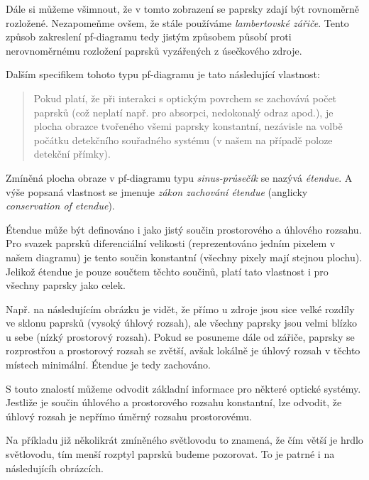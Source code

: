 Dále si můžeme všimnout, že v tomto zobrazení se paprsky zdají být rovnoměrně rozložené. Nezapomeňme ovšem, že stále používáme \emph{lambertovské zářiče}. Tento způsob zakreslení pf-diagramu tedy jistým způsobem působí proti nerovnoměrnému rozložení paprsků vyzářených z úsečkového zdroje.

Dalším specifikem tohoto typu pf-diagramu je tato následující vlastnost:

\begin{quote}
    Pokud platí, že při interakci s optickým povrchem se zachovává počet paprsků (což neplatí např. pro absorpci, nedokonalý odraz apod.), je plocha obrazce tvořeného všemi paprsky konstantní, nezávisle na volbě počátku detekčního souřadného systému (v našem na případě poloze detekční přímky).
\end{quote}

Zmíněná plocha obraze v pf-diagramu typu \emph{sinus-průsečík} se nazývá \emph{étendue}. A výše popsaná vlastnost se jmenuje \emph{zákon zachování étendue} (anglicky \emph{conservation of etendue}).

Étendue může být definováno i jako jistý součin prostorového a úhlového rozsahu. Pro svazek paprsků diferenciální velikosti (reprezentováno jedním pixelem v našem diagramu) je tento součin konstantní (všechny pixely mají stejnou plochu). Jelikož étendue je pouze součtem těchto součinů, platí tato vlastnost i pro všechny paprsky jako celek.

Např. na následujícím obrázku je vidět, že přímo u zdroje jsou sice velké rozdíly ve sklonu paprsků (vysoký úhlový rozsah), ale všechny paprsky jsou velmi blízko u sebe (nízký prostorový rozsah). Pokud se posuneme dále od zářiče, paprsky se rozprostřou a prostorový rozsah se zvětší, avšak lokálně je úhlový rozsah v těchto místech minimální. Étendue je tedy zachováno.


S touto znalostí můžeme odvodit základní informace pro některé optické systémy. Jestliže je součin úhlového a prostorového rozsahu konstantní, lze odvodit, že úhlový rozsah je nepřímo úměrný rozsahu prostorovému. 

Na příkladu již několikrát zmíněného světlovodu to znamená, že čím větší je hrdlo světlovodu, tím menší rozptyl paprsků budeme pozorovat. To je patrné i na následujícíh obrázcích.


